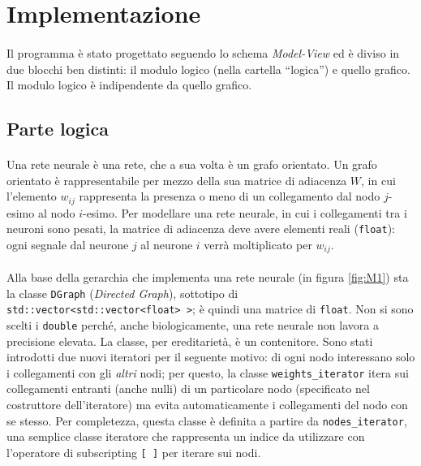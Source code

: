 \documentclass[12pt]{article}
\begin{document}

\section{Implementazione}

\paragraph{} Il programma è stato progettato seguendo lo schema \textit{Model-View} ed è diviso in due blocchi ben distinti: il modulo logico (nella cartella “logica”) e quello grafico. Il modulo logico è indipendente da quello grafico.

\subsection{Parte logica}

\paragraph{} Una rete neurale è una rete, che a sua volta è un grafo orientato. Un grafo orientato è rappresentabile per mezzo della sua matrice di adiacenza $W$, in cui l'elemento $w_{ij}$ rappresenta la presenza o meno di un collegamento dal nodo $j$-esimo al nodo $i$-esimo. Per modellare una rete neurale, in cui i collegamenti tra i neuroni sono pesati, la matrice di adiacenza deve avere elementi reali (\texttt{float}): ogni segnale dal neurone $j$ al neurone $i$ verrà moltiplicato per $w_{ij}$.

\paragraph{} Alla base della gerarchia che implementa una rete neurale (in figura \ref{fig:M1}) sta la classe \texttt{DGraph} (\emph{Directed Graph}), sottotipo di \texttt{std::vector<std::vector<float> >}; è quindi una matrice di \texttt{float}. Non si sono scelti i \texttt{double} perché, anche biologicamente, una rete neurale non lavora a precisione elevata. La classe, per ereditarietà, è un contenitore. Sono stati introdotti due nuovi iteratori per il seguente motivo: di ogni nodo interessano solo i collegamenti con gli \emph{altri} nodi; per questo, la classe \texttt{weights\_iterator} itera sui collegamenti entranti (anche nulli) di un particolare nodo (specificato nel costruttore dell'iteratore) ma evita automaticamente i collegamenti del nodo con se stesso. Per completezza, questa classe è definita a partire da \texttt{nodes\_iterator}, una semplice classe iteratore che rappresenta un indice da utilizzare con l'operatore di subscripting \texttt{[ ]} per iterare sui nodi.
\end{document}
